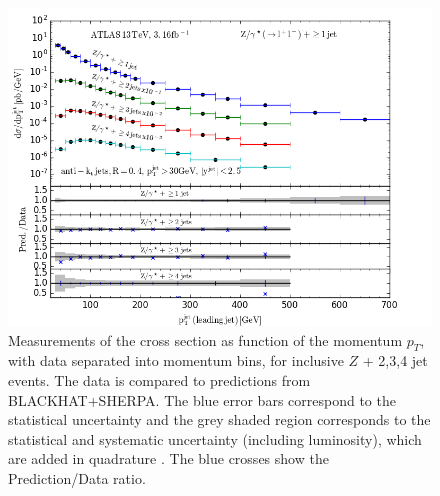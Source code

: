 \documentclass[12pt, onecolumn]{revtex4}    %
\begin{document}
\begin{figure} 
	\begin{center}
		\includegraphics[width=1 \textwidth]{xsection.jpg}
		\caption{Measurements of the cross section as function of the momentum ${p_T}$, with data separated into momentum bins, for inclusive ${Z}$ + 2,3,4 jet events. The data is compared to predictions from BLACKHAT+SHERPA. The blue error bars correspond to the statistical uncertainty and the grey shaded region corresponds to the statistical and systematic uncertainty (including luminosity), which are added in quadrature \cite{HEPD}. The blue crosses show the Prediction/Data ratio.}
		\label{xsection}
	\end{center}
\end{figure}
\end{document}
